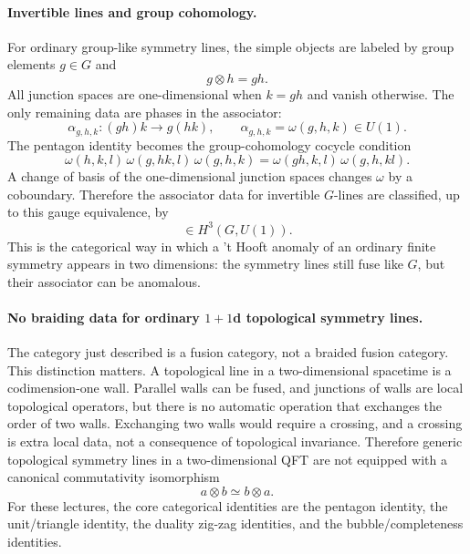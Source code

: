 \documentclass[11pt]{article}
\begin{document}
\paragraph{Invertible lines and group cohomology.}
For ordinary group-like symmetry lines, the simple objects are labeled by group elements $g\in G$ and
\begin{equation}
  g\otimes h=gh .
\end{equation}
All junction spaces are one-dimensional when $k=gh$ and vanish otherwise.  The only remaining data are phases in the associator:
\begin{equation}
  \alpha_{g,h,k}: (g h)k\to g(h k),
  \qquad
  \alpha_{g,h,k}=\omega(g,h,k)\in U(1) .
\end{equation}
The pentagon identity becomes the group-cohomology cocycle condition
\begin{equation}
  \omega(h,k,l)\,\omega(g,hk,l)\,\omega(g,h,k)
  =
  \omega(gh,k,l)\,\omega(g,h,kl) .
  \label{eq:groupcocyclecondition}
\end{equation}
A change of basis of the one-dimensional junction spaces changes $\omega$ by a coboundary.  Therefore the associator data for invertible $G$-lines are classified, up to this gauge equivalence, by
\begin{equation}
  [\omega]\in H^3(G,U(1)) .
\end{equation}
This is the categorical way in which a 't Hooft anomaly of an ordinary finite symmetry appears in two dimensions: the symmetry lines still fuse like $G$, but their associator can be anomalous.

\paragraph{No braiding data for ordinary $1+1$d topological symmetry lines.}
The category just described is a fusion category, not a braided fusion category.  This distinction matters.  A topological line in a two-dimensional spacetime is a codimension-one wall.  Parallel walls can be fused, and junctions of walls are local topological operators, but there is no automatic operation that exchanges the order of two walls.  Exchanging two walls would require a crossing, and a crossing is extra local data, not a consequence of topological invariance.  Therefore generic topological symmetry lines in a two-dimensional QFT are not equipped with a canonical commutativity isomorphism
\begin{equation}
  a\otimes b\simeq b\otimes a .
\end{equation}
For these lectures, the core categorical identities are the pentagon identity, the unit/triangle identity, the duality zig-zag identities, and the bubble/completeness identities.
\end{document}
